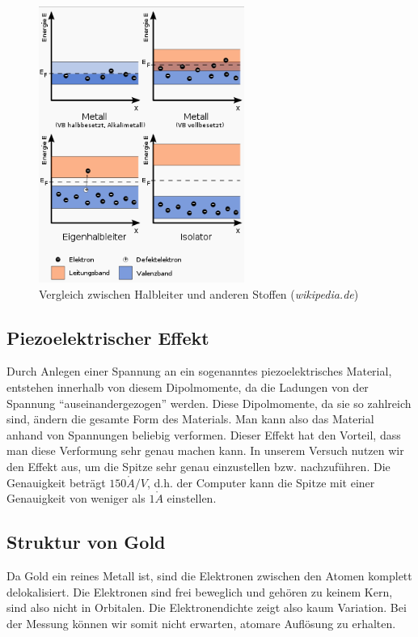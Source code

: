 \begin{figure}[H]
	\centering \includegraphics[width=0.6\textwidth]{Bilder/Halbleiter.png}
	\caption{Vergleich zwischen Halbleiter und anderen Stoffen (\emph{wikipedia.de})}
\end{figure}

\subsection{Piezoelektrischer Effekt}

Durch Anlegen einer Spannung an ein sogenanntes piezoelektrisches Material, entstehen innerhalb von diesem Dipolmomente, da die Ladungen von der Spannung "`auseinandergezogen"' werden. Diese Dipolmomente, da sie so zahlreich sind, ändern die gesamte Form des Materials. Man kann also das Material anhand von Spannungen beliebig verformen. Dieser Effekt hat den Vorteil, dass man diese Verformung sehr genau machen kann. In unserem Versuch nutzen wir den Effekt aus, um die Spitze sehr genau einzustellen bzw. nachzuführen. Die Genauigkeit beträgt $150 \mathring A/V$, d.h. der Computer kann die Spitze mit einer Genauigkeit von weniger als $1 \mathring A$ einstellen.

\subsection{Struktur von Gold}

Da Gold ein reines Metall ist, sind die Elektronen zwischen den Atomen komplett delokalisiert. Die Elektronen sind frei beweglich und gehören zu keinem Kern, sind also nicht in Orbitalen. Die Elektronendichte zeigt also kaum Variation. Bei der Messung können wir somit nicht erwarten, atomare Auflösung zu erhalten.

